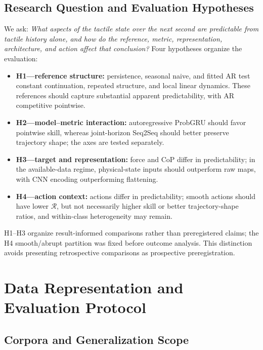 \documentclass[letterpaper, 10 pt, conference]{ieeeconf}
\newcommand{\Rdiff}{\mathcal{R}}
\begin{document}
\subsection{Research Question and Evaluation Hypotheses}
We ask: \emph{What aspects of the tactile state over the next second are predictable from tactile history alone, and how do the reference, metric, representation, architecture, and action affect that conclusion?} Four hypotheses organize the evaluation:
\begin{itemize}
    \item \textbf{H1---reference structure:} persistence, seasonal naive, and fitted AR test constant continuation, repeated structure, and local linear dynamics. These references should capture substantial apparent predictability, with AR competitive pointwise.
    \item \textbf{H2---model--metric interaction:} autoregressive ProbGRU should favor pointwise skill, whereas joint-horizon Seq2Seq should better preserve trajectory shape; the axes are tested separately.
    \item \textbf{H3---target and representation:} force and CoP differ in predictability; in the available-data regime, physical-state inputs should outperform raw maps, with CNN encoding outperforming flattening.
    \item \textbf{H4---action context:} actions differ in predictability; smooth actions should have lower $\Rdiff$, but not necessarily higher skill or better trajectory-shape ratios, and within-class heterogeneity may remain.
\end{itemize}
H1--H3 organize result-informed comparisons rather than preregistered claims; the H4 smooth/abrupt partition was fixed before outcome analysis. This distinction avoids presenting retrospective comparisons as prospective preregistration.

\section{Data Representation and Evaluation Protocol}
\label{sec:data}

\subsection{Corpora and Generalization Scope}
\end{document}
